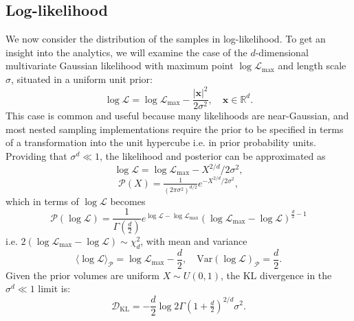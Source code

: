 \documentclass[usenatbib]{mnras}
\newcommand{\Like}{\mathcal{L}}
\newcommand{\logLmax}{\log \Like_\mathrm{max}}
\providecommand{\DIFaddtex}[1]{{\protect\color{blue}\uwave{#1}}} %
\providecommand{\DIFaddbegin}{} %
\providecommand{\DIFaddend}{} %
\providecommand{\DIFadd}[1]{\texorpdfstring{\DIFaddtex{#1}}{#1}} %
\newcommand{\DIFaddincludegraphics}[2][]{{\color{blue}\fbox{\DIFOincludegraphics[#1]{#2}}}} %
\DeclareRobustCommand{\DIFaddbegin}{\DIFOaddbegin \let\includegraphics\DIFaddincludegraphics} %
\DeclareRobustCommand{\DIFaddend}{\DIFOaddend \let\includegraphics\DIFOincludegraphics} %
\begin{document}
\subsection{Log-likelihood}\label{sec:logL}
We now consider the distribution of the samples in log-likelihood. To get an insight into the analytics, we will examine the case of the \DIFaddbegin \DIFadd{isotropic, }\DIFaddend $d$-dimensional multivariate Gaussian likelihood with maximum point $\logLmax$ and length scale $\sigma$, situated in a uniform unit prior:
\begin{equation}\label{eq:logL_x}
    \log\Like = \logLmax - \frac{|\bm{x}|^{2}}{2\sigma^{2}}, \quad \bm{x} \in \mathbb{R}^{d}.
\end{equation}
This case is common and useful because many likelihoods are near-Gaussian, and most nested sampling implementations require the prior to be specified in terms of a transformation into the unit hypercube i.e. in prior probability units. Providing that $\sigma^d \ll 1$, the likelihood and posterior can be approximated as
\begin{equation}\label{eq:gaussian_logL}
    \log \Like = \logLmax - X^{2/d}/2\sigma^2,
\end{equation}
\begin{equation}
    \mathcal{P}(X) = \tfrac{1}{(2\pi\sigma^2)^{d/2}} e^{-X^{2/d}/2\sigma^2}, 
    \label{eqn:PX}
\end{equation}
which in terms of $\log\mathcal{L}$ becomes
\begin{equation}
    \mathcal{P}(\log\mathcal{L}) = \frac{1}{\Gamma\left(\frac{d}{2}\right)}e^{\log\mathcal{L}-\log\mathcal{L}_\mathrm{max}} (\log\mathcal{L}_\mathrm{max}-\log\mathcal{L})^{\frac{d}{2}-1}
\end{equation}
i.e. $2(\log\mathcal{L}_\mathrm{max}-\log\mathcal{L}) \sim \chi^2_{d}$, with mean and variance
\begin{equation}
    \langle\log\mathcal{L}\rangle_\mathcal{P} = \log\mathcal{L}_\mathrm{max} - \frac{d}{2},  \quad \mathrm{Var}(\log\mathcal{L})_\mathcal{P} = \frac{d}{2}.
\end{equation}
Given the prior volumes are uniform $X\sim U(0,1)$, the KL divergence in the $\sigma^d \ll 1$ limit is:
\begin{equation}
\mathcal{D}_\mathrm{KL} = -\frac{d}{2}\log 2 \Gamma(1+\tfrac{d}{2})^{2/d} \sigma^2.
\end{equation}
\end{document}
